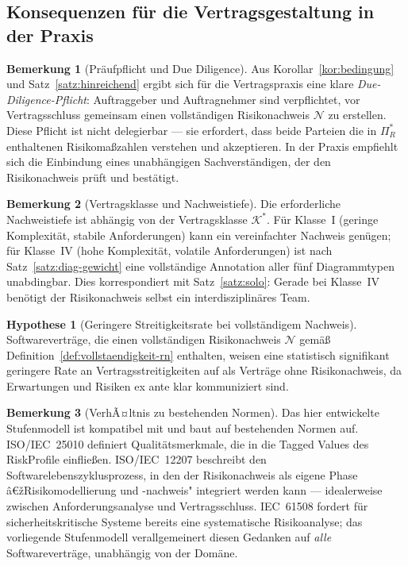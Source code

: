﻿\documentclass[a4paper,12pt]{article}
\theoremstyle{definition}
\newtheorem{bemerkung}{Bemerkung}
\newtheorem{hypothese}{Hypothese}
\begin{document}
\subsection{Konsequenzen f\"ur die Vertragsgestaltung in der Praxis}

\begin{bemerkung}[Pr\"aufpflicht und Due Diligence]
    Aus Korollar~\ref{kor:bedingung} und Satz~\ref{satz:hinreichend} ergibt sich f\"ur
    die Vertragspraxis eine klare \emph{Due-Diligence-Pflicht}: Auftraggeber und
    Auftragnehmer sind verpflichtet, vor Vertragsschluss gemeinsam einen vollst\"andigen
    Risikonachweis $\mathcal{N}$ zu erstellen. Diese Pflicht ist nicht delegierbar ---
    sie erfordert, dass beide Parteien die in $\Pi_R^*$ enthaltenen Risikoma\ss{}zahlen
    verstehen und akzeptieren. In der Praxis empfiehlt sich die Einbindung eines
    unabh\"angigen Sachverst\"andigen, der den Risikonachweis pr\"uft und best\"atigt.
\end{bemerkung}

\begin{bemerkung}[Vertragsklasse und Nachweistiefe]
    Die erforderliche Nachweistiefe ist abh\"angig von der Vertragsklasse
    $\mathcal{K}^*$. F\"ur Klasse~I (geringe Komplexit\"at, stabile Anforderungen)
    kann ein vereinfachter Nachweis gen\"ugen; f\"ur Klasse~IV (hohe Komplexit\"at,
    volatile Anforderungen) ist nach Satz~\ref{satz:diag-gewicht} eine vollst\"andige
    Annotation aller f\"unf Diagrammtypen unabdingbar. Dies korrespondiert mit
    Satz~\ref{satz:solo}: Gerade bei Klasse~IV ben\"otigt der Risikonachweis selbst
    ein interdisziplin\"ares Team.
\end{bemerkung}

\begin{hypothese}[Geringere Streitigkeitsrate bei vollst\"andigem Nachweis]
\label{hyp:streit}
    Softwarevertr\"age, die einen vollst\"andigen Risikonachweis $\mathcal{N}$
    gem\"a\ss{} Definition~\ref{def:vollstaendigkeit-rn} enthalten, weisen eine
    statistisch signifikant geringere Rate an Vertragsstreitigkeiten auf als Vertr\"age
    ohne Risikonachweis, da Erwartungen und Risiken ex ante klar kommuniziert sind.
\end{hypothese}

\begin{bemerkung}[VerhÃ¤ltnis zu bestehenden Normen]
    Das hier entwickelte Stufenmodell ist kompatibel mit und baut auf bestehenden
    Normen auf. ISO/IEC~25010 definiert Qualit\"atsmerkmale, die in die Tagged Values
    des \textsf{RiskProfile} einflie\ss{}en. ISO/IEC~12207 beschreibt den
    Softwarelebenszyklusprozess, in den der Risikonachweis als eigene Phase
    â€žRisikomodellierung und -nachweis" integriert werden kann --- idealerweise zwischen
    Anforderungsanalyse und Vertragsschluss. IEC~61508 fordert f\"ur sicherheitskritische
    Systeme bereits eine systematische Risikoanalyse; das vorliegende Stufenmodell
    verallgemeinert diesen Gedanken auf \emph{alle} Softwarevertr\"age, unabh\"angig
    von der Dom\"ane.
\end{bemerkung}
\end{document}
